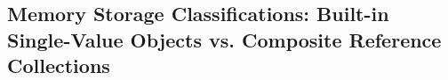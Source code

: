 \subsection{Memory Storage Classifications: Built-in Single-Value Objects vs. Composite Reference Collections}
